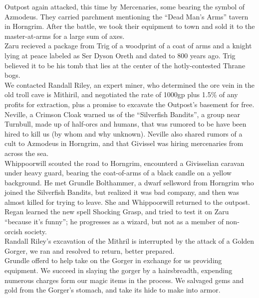 \documentclass[letterpaper]{article}
\begin{document}
\noindent Outpost again attacked, this time by Mercenaries, some bearing the symbol of Azmodeus.  They carried parchment mentioning the ``Dead Man's Arms'' tavern in Horngrim.  After the battle, we took their equipment to town and sold it to the master-at-arms for a large sum of axes.\\

\noindent Zaru recieved a package from Trig of a woodprint of a coat of arms and a knight lying at peace labeled as Ser Dyson Oreth and dated to 800 years ago.  Trig believed it to be his tomb that lies at the center of the hotly-contested Thrane bogs.\\

\noindent We contacted Randall Riley, an expert miner, who determined the ore vein in the old troll cave is Mithiril, and negotiated the rate of 1000gp plus 1.5\% of any profits for extraction, plus a promise to excavate the Outpost's basement for free.\\

\noindent Neville, a Crimson Cloak warned us of the ``Silverfish Bandits'', a group near Turnbull, made up of half-orcs and humans, that was rumored to be have been hired to kill us (by whom and why unknown). Neville also shared rumors of a cult to Azmodeus in Horngrim, and that Givissel was hiring mercenaries from across the sea.\\

\noindent Whippoorwill scouted the road to Horngrim, encounterd a Givisselian caravan under heavy guard, bearing the coat-of-arms of a black candle on a yellow background.  He met Grundle Bolthammer, a dwarf sellsword from Horngrim who joined the Silverfish Bandits, but realized it was bad company, and then was almost killed for trying to leave. She and Whippoorwill returned to the outpost.\\

\noindent Regan learned the new spell Shocking Grasp, and tried to test it on Zaru ``because it's funny''; he progresses as a wizard, but not as a member of non-orcish society.\\

\noindent Randall Riley's excavation of the Mithril is interrupted by the attack of a Golden Gorger, we ran and resolved to return, better prepared.\\

\noindent Grundle offerd to help take on the Gorger in exchange for us providing equipment. We succeed in slaying the gorger by a hairsbreadth, expending numerous charges form our magic items in the process. We salvaged gems and gold from the Gorger's stomach, and take its hide to make into armor.\\
\end{document}
